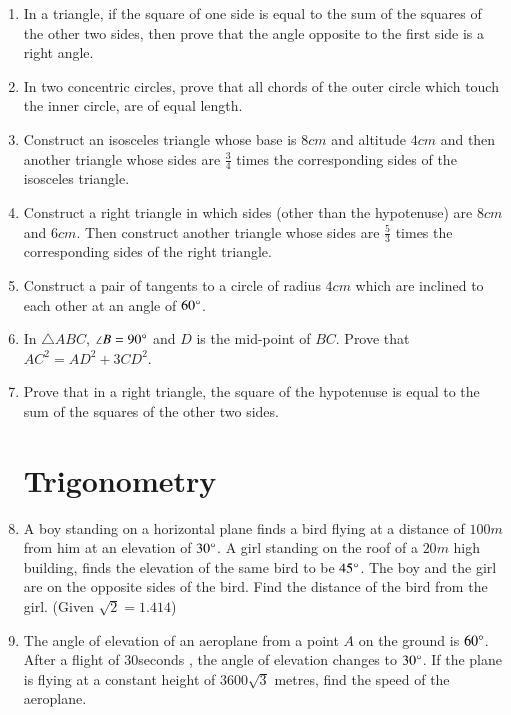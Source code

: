 \documentclass[2pt,-letter paper]{article}
\begin{document}
\begin{enumerate}
\item In a triangle, if the square of one side is equal to the sum of the squares of the other two sides, then prove that the angle opposite to the first side is a right angle.

\item In two concentric circles, prove that all chords of the outer circle which touch the inner circle, are of equal length.

\item Construct an isosceles triangle whose base is $8 cm$ and altitude $4 cm$ and then another triangle whose sides are $\frac{3}{4}$ times the corresponding sides of the isosceles triangle.

\item Construct a right triangle in which sides (other than the hypotenuse) are $8 cm$ and $6 cm$. Then construct another triangle whose sides are $\frac{5}{3}$ times the corresponding sides of the right triangle.

\item Construct a pair of tangents to a circle of radius $4 cm$ which are inclined to each other at an angle of $60\degree$.

\item In ${\triangle ABC}$, ${\angle B} = {90\degree}$ and $D$ is the mid-point of $BC$. Prove that ${AC}^2 = {AD}^2 + 3{CD}^2$.

\item Prove that in a right triangle, the square of the hypotenuse is equal to the sum of the squares of the other two sides.

\section{Trigonometry}

\item A boy standing on a horizontal plane finds a bird flying at a distance of $100 m$ from him at an elevation of $30\degree$. A girl standing on the roof of a $20 m$ high building, finds the elevation of the same bird to be $45\degree$. The boy and the girl are on the opposite sides of the bird. Find the distance of the bird from the girl. (Given ${\sqrt 2}= 1.414$)

\item The angle of elevation of an aeroplane from a point $A$ on the ground is $60\degree$. After a flight of $30 $seconds , the angle of elevation changes to $30\degree$. If the plane is flying at a constant height of $3600\sqrt 3 $ metres, find the speed of the aeroplane.


\end{enumerate}
\end{document}
